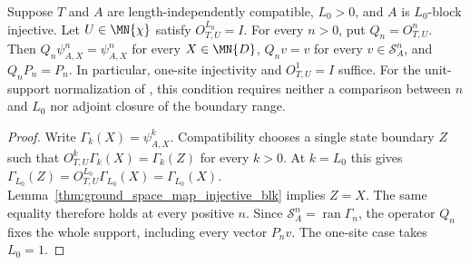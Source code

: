 \begin{lemma}
    \label{thm:glm_boundary_unit_support}
    \leanok
    Suppose $T$ and $A$ are length-independently compatible, $L_0>0$,
    and $A$ is $L_0$-block injective. Let $U\in\MN{\chi}$ satisfy
    $O^{L_0}_{T,U}=I$. For every $n>0$, put $Q_n=O^n_{T,U}$.
    Then $Q_n\psi^n_{A,X}=\psi^n_{A,X}$ for every $X\in\MN{D}$,
    $Q_nv=v$ for every $v\in\mathcal S_A^n$, and $Q_nP_n=P_n$.
    In particular, one-site injectivity and $O^1_{T,U}=I$ suffice.
    For the unit-support normalization of
    \cite[Appendix~B]{GarreRubio2023MPOSym}, this condition requires neither
    a comparison between $n$ and $L_0$ nor adjoint closure of the boundary
    range.
\end{lemma}
\begin{proof}
    \leanok
    Write $\Gamma_k(X)=\psi^k_{A,X}$. Compatibility chooses a single
    state boundary $Z$ such that $O^k_{T,U}\Gamma_k(X)=\Gamma_k(Z)$
    for every $k>0$. At $k=L_0$ this gives
    $\Gamma_{L_0}(Z)=O^{L_0}_{T,U}\Gamma_{L_0}(X)=\Gamma_{L_0}(X)$.
    Lemma~\ref{thm:ground_space_map_injective_blk} implies $Z=X$.
    The same equality therefore holds at every positive $n$.
    Since $\mathcal S_A^n=\operatorname{ran}\Gamma_n$, the operator
    $Q_n$ fixes the whole support, including every vector $P_nv$.
    The one-site case takes $L_0=1$.
\end{proof}


